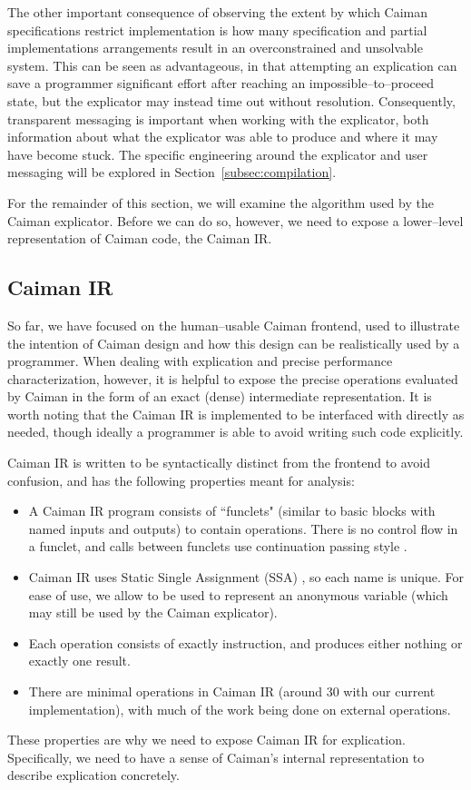 The other important consequence of observing the extent by which Caiman specifications restrict implementation is how many specification and partial implementations arrangements result in an overconstrained and unsolvable system.  This can be seen as advantageous, in that attempting an explication can save a programmer significant effort after reaching an impossible--to--proceed state, but the explicator may instead time out without resolution.  Consequently, transparent messaging is important when working with the explicator, both information about what the explicator was able to produce and where it may have become stuck.  The specific engineering around the explicator and user messaging will be explored in Section~\ref{subsec:compilation}.

For the remainder of this section, we will examine the algorithm used by the Caiman explicator.  Before we can do so, however, we need to expose a lower--level representation of Caiman code, the Caiman IR.

\subsection{Caiman IR}
\label{subsec:ir}

So far, we have focused on the human--usable Caiman frontend, used to illustrate the intention of Caiman design and how this design can be realistically used by a programmer.  When dealing with explication and precise performance characterization, however, it is helpful to expose the precise operations evaluated by Caiman in the form of an exact (dense) intermediate representation.  It is worth noting that the Caiman IR is implemented to be interfaced with directly as needed, though ideally a programmer is able to avoid writing such code explicitly.

Caiman IR is written to be syntactically distinct from the frontend to avoid confusion, and has the following properties meant for analysis:
%
\begin{itemize}
\item A Caiman IR program consists of ``funclets" (similar to basic blocks with named inputs and outputs) to contain operations.  There is no control flow in a funclet, and calls between funclets use continuation passing style .
\item Caiman IR uses Static Single Assignment (SSA) , so each name is unique.  For ease of use, we allow \code{\%_} to be used to represent an anonymous variable (which may still be used by the Caiman explicator).
\item Each operation consists of exactly instruction, and produces either nothing or exactly one result.
\item There are minimal operations in Caiman IR (around 30 with our current implementation), with much of the work being done on external operations.
\end{itemize}
%
These properties are why we need to expose Caiman IR for explication.  Specifically, we need to have a sense of Caiman's internal representation to describe explication concretely.  

